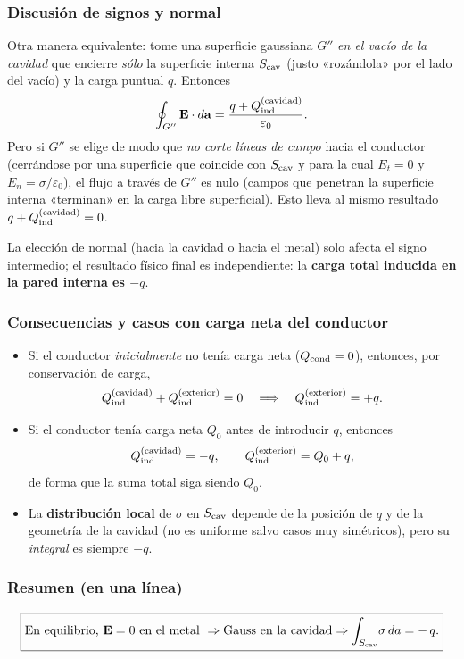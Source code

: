 \documentclass{article}
\begin{document}
\subsubsection*{Discusión de signos y normal}
Otra manera equivalente: tome una superficie gaussiana $G''$ \emph{en el vacío de la cavidad} que encierre \emph{sólo} la superficie interna $S_{\rm cav}$ (justo «rozándola» por el lado del vacío) y la carga puntual $q$. Entonces
\[
\oint_{G''}\mathbf E\cdot d\mathbf a = \frac{q+Q_{\rm ind}^{(\text{cavidad})}}{\varepsilon_0}.
\]
Pero si $G''$ se elige de modo que \emph{no corte líneas de campo} hacia el conductor (cerrándose por una superficie que coincide con $S_{\rm cav}$ y para la cual $E_t=0$ y $E_n=\sigma/\varepsilon_0$), el flujo a través de $G''$ es nulo (campos que penetran la superficie interna «terminan» en la carga libre superficial). Esto lleva al mismo resultado $q+Q_{\rm ind}^{(\text{cavidad})}=0$.

La elección de normal (hacia la cavidad o hacia el metal) solo afecta el signo intermedio; el resultado físico final es independiente: la \textbf{carga total inducida en la pared interna es $-q$}.

\subsubsection*{Consecuencias y casos con carga neta del conductor}
\begin{itemize}
\item Si el conductor \emph{inicialmente} no tenía carga neta ($Q_{\rm cond}=0$), entonces, por conservación de carga,
\[
Q_{\rm ind}^{(\text{cavidad})}+Q_{\rm ind}^{(\text{exterior})}=0
\quad\Longrightarrow\quad
Q_{\rm ind}^{(\text{exterior})}=+q.
\]
\item Si el conductor tenía carga neta $Q_0$ antes de introducir $q$, entonces
\[
Q_{\rm ind}^{(\text{cavidad})}=-q,\qquad
Q_{\rm ind}^{(\text{exterior})}=Q_0+q,
\]
de forma que la suma total siga siendo $Q_0$.
\item La \textbf{distribución local} de $\sigma$ en $S_{\rm cav}$ depende de la posición de $q$ y de la geometría de la cavidad (no es uniforme salvo casos muy simétricos), pero su \emph{integral} es siempre $-q$.
\end{itemize}

\subsubsection*{Resumen (en una línea)}
\[
\boxed{\text{En equilibrio, } \mathbf E=0 \text{ en el metal }\Rightarrow \text{Gauss en la cavidad} \Rightarrow 
\int_{S_{\rm cav}}\!\sigma\,da = -\,q.}
\]
\end{document}
